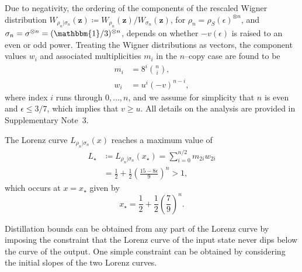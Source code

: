 \documentclass[
onecolumn,
superscriptaddress
]{revtex4-1}
\def\id{\mathbbm{1}}
\def\z{\boldsymbol{z}}
\begin{document}
Due to negativity, the ordering of the components of the rescaled Wigner distribution $W_{\rho_n |\sigma_n}(\z) \coloneqq W_{\rho_n}(\z)/W_{\sigma_n}(\z)$, for $\rho_n = \rho_S(\epsilon)^{\otimes n}$, and $\sigma_n = \sigma^{\otimes n}= (\id/3)^{\otimes n}$, depends on whether $-v(\epsilon)$ is raised to an even or odd power. Treating the Wigner distributions as vectors, the component values $w_i$ and associated multiplicities $m_i$ in the $n$--copy case are found to be 
\begin{align}
	m_i &= 8^{i}\binom{n}{i}, \\
	w_i &= u^{i}(-v)^{n-i}, \label{eq:wigu}
\end{align}
where index $i$ runs through $0, \dots, n$, and we assume for simplicity that $n$ is even and $\epsilon \leq 3/7$, which implies that $v \geq u$.
All details on the analysis are provided in Supplementary Note~3.

The Lorenz curve $L_{\rho_n|\sigma_n}(x)$ reaches a maximum value of
\begin{align}\label{eq:lcsu_max}
	L_\star &\coloneqq L_{\rho_n |\sigma_n} (x_\star) = \sum_{i = 0}^{n/2} m_{2i} w_{2i} \nonumber\\
	&= \frac{1}{2} + \frac{1}{2}\left(\frac{15 - 8\epsilon}{9}\right)^n > 1,
\end{align}
which occurs at $x=x_\star$ given by
\begin{equation}
	x_\star = \frac{1}{2} + \frac{1}{2}\left(\frac{7}{9}\right)^n.
\end{equation}

Distillation bounds can be obtained from any part of the Lorenz curve by imposing the constraint that the Lorenz curve of the input state never dips below the curve of the output. One simple constraint can be obtained by considering the initial slopes of the two Lorenz curves. 
\end{document}
